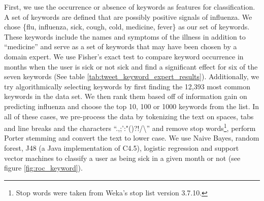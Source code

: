 \documentclass{acm_proc_article-sp}
\begin{document}
First, we use the occurrence or absence of keywords as features for classification. A set of keywords are defined that are possibly positive signals of influenza. We chose \{flu, influenza, sick, cough, cold, medicine, fever\} as our set of keywords. These keywords include the names and symptoms of the illness in addition to ``medicine'' and serve as a set of keywords that may have been chosen by a domain expert. We use Fisher's exact test to compare keyword occurrence in months when the user is sick or not sick and find a significant effect for six of the seven keywords (See table \ref{tab:tweet_keyword_expert_results}). Additionally, we try algorithmically selecting keywords by first finding the 12,393 most common keywords in the data set.  We then rank them based off of information gain on predicting influenza and choose the top 10, 100 or 1000 keywords from the list. In all of these cases, we pre-process the data by tokenizing the text on spaces, tabs and line breaks and the characters ``.,;':"()?!/\textbackslash '' and remove stop words\footnote{Stop words were taken from Weka's stop list version 3.7.10.}, perform Porter stemming \cite{Porter:1980dd,Willett:2006vb}  and convert the text to lower case. We use Naive Bayes, random forest, J48 (a Java implementation of C4.5), logistic regression and support vector machines to classify a user as being sick in a given month or not (see figure \ref{fig:roc_keyword}).
\end{document}
